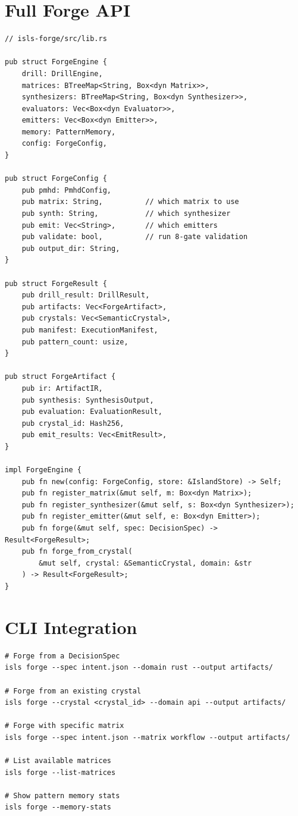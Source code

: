 \documentclass[11pt,a4paper,twoside]{article}
\theoremstyle{definition}
\theoremstyle{plain}
\theoremstyle{remark}
\begin{document}
\section{Full Forge API}\label{sec:forge:api}

\begin{lstlisting}
// isls-forge/src/lib.rs

pub struct ForgeEngine {
    drill: DrillEngine,
    matrices: BTreeMap<String, Box<dyn Matrix>>,
    synthesizers: BTreeMap<String, Box<dyn Synthesizer>>,
    evaluators: Vec<Box<dyn Evaluator>>,
    emitters: Vec<Box<dyn Emitter>>,
    memory: PatternMemory,
    config: ForgeConfig,
}

pub struct ForgeConfig {
    pub pmhd: PmhdConfig,
    pub matrix: String,          // which matrix to use
    pub synth: String,           // which synthesizer
    pub emit: Vec<String>,       // which emitters
    pub validate: bool,          // run 8-gate validation
    pub output_dir: String,
}

pub struct ForgeResult {
    pub drill_result: DrillResult,
    pub artifacts: Vec<ForgeArtifact>,
    pub crystals: Vec<SemanticCrystal>,
    pub manifest: ExecutionManifest,
    pub pattern_count: usize,
}

pub struct ForgeArtifact {
    pub ir: ArtifactIR,
    pub synthesis: SynthesisOutput,
    pub evaluation: EvaluationResult,
    pub crystal_id: Hash256,
    pub emit_results: Vec<EmitResult>,
}

impl ForgeEngine {
    pub fn new(config: ForgeConfig, store: &IslandStore) -> Self;
    pub fn register_matrix(&mut self, m: Box<dyn Matrix>);
    pub fn register_synthesizer(&mut self, s: Box<dyn Synthesizer>);
    pub fn register_emitter(&mut self, e: Box<dyn Emitter>);
    pub fn forge(&mut self, spec: DecisionSpec) -> Result<ForgeResult>;
    pub fn forge_from_crystal(
        &mut self, crystal: &SemanticCrystal, domain: &str
    ) -> Result<ForgeResult>;
}
\end{lstlisting}


\section{CLI Integration}\label{sec:forge:cli}

\begin{lstlisting}
# Forge from a DecisionSpec
isls forge --spec intent.json --domain rust --output artifacts/

# Forge from an existing crystal
isls forge --crystal <crystal_id> --domain api --output artifacts/

# Forge with specific matrix
isls forge --spec intent.json --matrix workflow --output artifacts/

# List available matrices
isls forge --list-matrices

# Show pattern memory stats
isls forge --memory-stats
\end{lstlisting}
\end{document}
